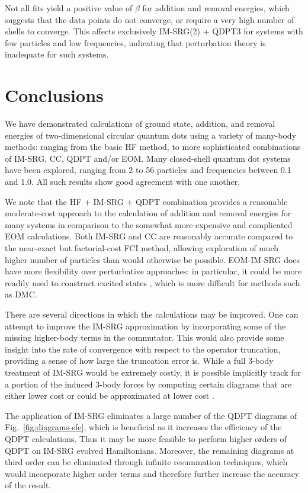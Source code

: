 Not all fits yield a positive value of $\beta$ for addition and removal energies, which suggests that the data points do not converge, or require a very high number of shells to converge.  This affects exclusively IM-SRG(2) + QDPT3 for systems with few particles and low frequencies, indicating that perturbation theory is inadequate for such systems.

\section{Conclusions}
\label{sec:conclusions}

We have demonstrated calculations of ground state, addition, and removal energies of two-dimensional circular quantum dots using a variety of many-body methods: ranging from the basic HF method, to more sophisticated combinations of IM-SRG, CC, QDPT and/or EOM.  Many closed-shell quantum dot systems have been explored, ranging from 2 to 56 particles and frequencies between 0.1 and 1.0.  All such results show good agreement with one another.

We note that the HF + IM-SRG + QDPT combination provides a reasonable moderate-cost approach to the calculation of addition and removal energies for many systems in comparison to the somewhat more expensive and complicated EOM calculations.  Both IM-SRG and CC are reasonably accurate compared to the near-exact but factorial-cost FCI method, allowing exploration of much higher number of particles than would otherwise be possible.  EOM-IM-SRG does have more flexibility over perturbative approaches: in particular, it could be more readily used to construct excited states \cite{PhysRevC.95.044304}, which is more difficult for methods such as DMC.

There are several directions in which the calculations may be improved.  One can attempt to improve the IM-SRG approximation by incorporating some of the missing higher-body terms in the commutator.  This would also provide some insight into the rate of convergence with respect to the operator truncation, providing a sense of how large the truncation error is.  While a full 3-body treatment of IM-SRG would be extremely costly, it is possible implicitly track for a portion of the induced 3-body forces by computing certain diagrams that are either lower cost or could be approximated at lower cost \cite{IMSRG}.

The application of IM-SRG eliminates a large number of the QDPT diagrams of Fig.\ \ref{fig:diagrams-sfe}, which is beneficial as it increases the efficiency of the QDPT calculations.  Thus it may be more feasible to perform higher orders of QDPT on IM-SRG evolved Hamiltonians.  Moreover, the remaining diagrams at third order can be eliminated through infinite resummation techniques, which would incorporate higher order terms and therefore further increase the accuracy of the result.

